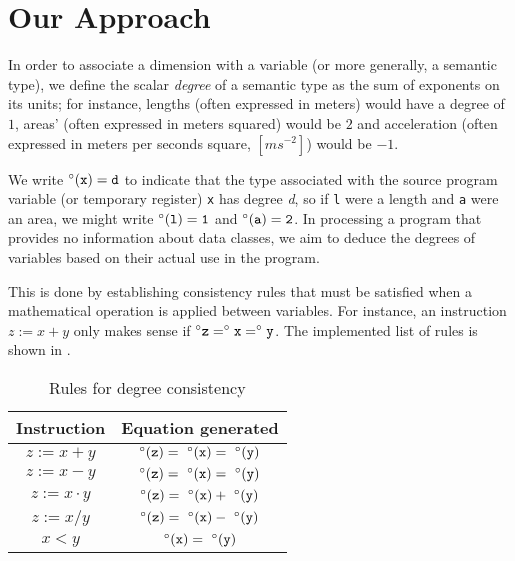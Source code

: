 \documentclass[12pt]{article}
\begin{document}
\section{Our Approach}
\label{sec:approach}

In order to associate a dimension with a variable (or more generally, a semantic type), we define the scalar \textit{degree} of a semantic type as the sum of exponents on its units; for instance, lengths (often expressed in meters) would have a degree of $1$, areas' (often expressed in meters squared) would be $2$ and acceleration (often expressed in meters per seconds square, $[m s^{-2}]$) would be $-1$.

We write $\degree(\tt{x}) = d$ to indicate that the type associated with the source program variable (or temporary register) \texttt{x} has degree \textit{d}, so if \texttt{l} were a length and \texttt{a} were an area, we might write $\degree(\tt{l}) = 1$ and $\degree(\tt{a}) = 2$.
In processing a program that provides no information about data classes, we aim to deduce the degrees of variables based on their actual use in the program.

This is done by establishing consistency rules that must be satisfied when a mathematical operation is applied between variables. For instance, an instruction $z := x + y$ only makes sense if $\degree{\tt{z}} = \degree{\tt{x}} = \degree{\tt{y}}$. The implemented list of rules is shown in .

\begin{table}[H]
  \centering
  \setlength{\tabcolsep}{20pt}
  \begin{tabular}{c | c}
    \textbf{Instruction} & \textbf{Equation generated} \\
    \hline
    $z := x + y$ & $\degree(\tt{z}) =\ \degree(\tt{x}) =\ \degree(\tt{y})$ \\
    $z := x - y$ & $\degree(\tt{z}) =\ \degree(\tt{x}) =\ \degree(\tt{y})$ \\
    $z := x \cdot y$ & $\degree(\tt{z}) =\ \degree(\tt{x}) +\ \degree(\tt{y})$ \\
    $z := x / y$ & $\degree(\tt{z}) =\ \degree(\tt{x}) -\ \degree(\tt{y})$ \\
    $x < y$ & $\degree(\tt{x}) =\ \degree(\tt{y})$ \\
  \end{tabular}
  \caption{Rules for degree consistency}
  \label{table:dimensional-rules}
\end{table}
\end{document}
